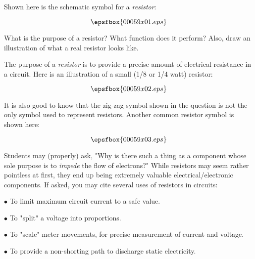 

Shown here is the schematic symbol for a {\it resistor}:

$$\epsfbox{00059x01.eps}$$

What is the purpose of a resistor?  What function does it perform?  Also, draw an illustration of what a real resistor looks like.







The purpose of a {\it resistor} is to provide a precise amount of electrical resistance in a circuit.  Here is an illustration of a small (1/8 or 1/4 watt) resistor:

$$\epsfbox{00059x02.eps}$$

It is also good to know that the zig-zag symbol shown in the question is not the only symbol used to represent resistors.  Another common resistor symbol is shown here:

$$\epsfbox{00059x03.eps}$$







Students may (properly) ask, "Why is there such a thing as a component whose sole purpose is to {\it impede} the flow of electrons?"  While resistors may seem rather pointless at first, they end up being extremely valuable electrical/electronic components.  If asked, you may cite several uses of resistors in circuits:

\medskip
\item{$\bullet$} To limit maximum circuit current to a safe value.
\item{$\bullet$} To "split" a voltage into proportions.
\item{$\bullet$} To "scale" meter movements, for precise measurement of current and voltage.
\item{$\bullet$} To provide a non-shorting path to discharge static electricity.
\medskip




